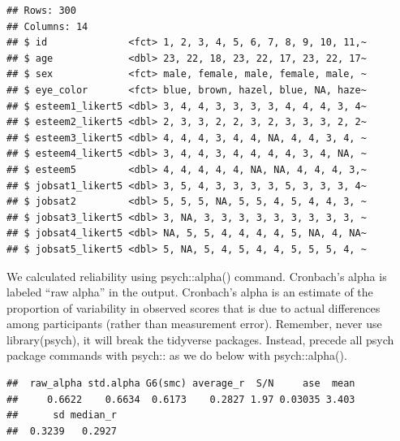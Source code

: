 \documentclass[
]{krantz}
\makeatletter
\newenvironment{Shaded}{\begin{snugshade}}{\end{snugshade}}
\newcommand{\FunctionTok}[1]{\textcolor[rgb]{0,0,0}{#1}}
\newcommand{\NormalTok}[1]{#1}
\newcommand{\OtherTok}[1]{\textcolor[rgb]{0.37,0.37,0.37}{#1}}
\newcommand{\SpecialCharTok}[1]{\textcolor[rgb]{0,0,0}{#1}}
\newcommand{\StringTok}[1]{\textcolor[rgb]{0.5,0.5,0.5}{#1}}
\newenvironment{kframe}{%
\medskip{}
\setlength{\fboxsep}{.8em}
 \def\at@end@of@kframe{}%
 \ifinner\ifhmode%
  \def\at@end@of@kframe{\end{minipage}}%
  \begin{minipage}{\columnwidth}%
 \fi\fi%
 \def\FrameCommand##1{\hskip\@totalleftmargin \hskip-\fboxsep
 \colorbox{shadecolor}{##1}\hskip-\fboxsep
     \hskip-\linewidth \hskip-\@totalleftmargin \hskip\columnwidth}%
 \MakeFramed {\advance\hsize-\width
   \@totalleftmargin\z@ \linewidth\hsize
   \@setminipage}}%
 {\par\unskip\endMakeFramed%
 \at@end@of@kframe}
\renewenvironment{Shaded}{\begin{kframe}}{\end{kframe}}
\makeatother
\begin{document}
\begin{verbatim}
## Rows: 300
## Columns: 14
## $ id              <fct> 1, 2, 3, 4, 5, 6, 7, 8, 9, 10, 11,~
## $ age             <dbl> 23, 22, 18, 23, 22, 17, 23, 22, 17~
## $ sex             <fct> male, female, male, female, male, ~
## $ eye_color       <fct> blue, brown, hazel, blue, NA, haze~
## $ esteem1_likert5 <dbl> 3, 4, 4, 3, 3, 3, 3, 4, 4, 4, 3, 4~
## $ esteem2_likert5 <dbl> 2, 3, 3, 2, 2, 3, 2, 3, 3, 3, 2, 2~
## $ esteem3_likert5 <dbl> 4, 4, 4, 3, 4, 4, NA, 4, 4, 3, 4, ~
## $ esteem4_likert5 <dbl> 3, 4, 4, 3, 4, 4, 4, 4, 3, 4, NA, ~
## $ esteem5         <dbl> 4, 4, 4, 4, 4, NA, NA, 4, 4, 4, 3,~
## $ jobsat1_likert5 <dbl> 3, 5, 4, 3, 3, 3, 3, 5, 3, 3, 3, 4~
## $ jobsat2         <dbl> 5, 5, 5, NA, 5, 5, 4, 5, 4, 4, 3, ~
## $ jobsat3_likert5 <dbl> 3, NA, 3, 3, 3, 3, 3, 3, 3, 3, 3, ~
## $ jobsat4_likert5 <dbl> NA, 5, 5, 4, 4, 4, 4, 5, NA, 4, NA~
## $ jobsat5_likert5 <dbl> 5, NA, 5, 4, 5, 4, 4, 5, 5, 5, 4, ~
\end{verbatim}

We calculated reliability using psych::alpha() command. Cronbach's alpha is labeled ``raw alpha'' in the output. Cronbach's alpha is an estimate of the proportion of variability in observed scores that is due to actual differences among participants (rather than measurement error). Remember, never use library(psych), it will break the tidyverse packages. Instead, precede all psych package commands with psych:: as we do below with psych::alpha().

\begin{Shaded}
\end{Shaded}

\begin{verbatim}
##  raw_alpha std.alpha G6(smc) average_r  S/N     ase  mean
##     0.6622    0.6634  0.6173    0.2827 1.97 0.03035 3.403
##      sd median_r
##  0.3239   0.2927
\end{verbatim}
\end{document}
